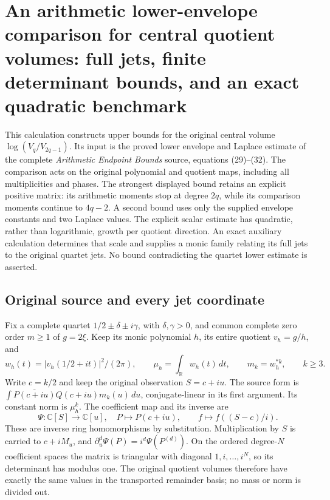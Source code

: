 \begingroup
\def\C{\mathbb{C}}
\def\R{\mathbb{R}}
\def\Tr{\operatorname{Tr}}
\def\diag{\operatorname{diag}}
\section{An arithmetic lower-envelope comparison for central quotient volumes: full jets, finite determinant bounds, and an exact quadratic benchmark}



This calculation constructs upper bounds for the original central volume
$\log(V_q/V_{2q-1})$. Its input is the proved lower envelope and Laplace
estimate of the complete \emph{Arithmetic Endpoint Bounds} source, equations
(29)--(32). The comparison acts on the original polynomial and quotient
maps, including all multiplicities and phases. The strongest displayed
bound retains an explicit positive matrix: its arithmetic moments stop at
degree $2q$, while its comparison moments continue to $4q-2$. A second
bound uses only the supplied envelope constants and two Laplace values.
The explicit scalar estimate has quadratic, rather than logarithmic,
growth per quotient direction. An exact auxiliary calculation determines
that scale and supplies a monic family relating its full jets to the
original quartet jets. No bound contradicting the quartet lower estimate
is asserted.

\subsection{Original source and every jet coordinate}

Fix a complete quartet $1/2\pm\delta\pm i\gamma$, with
$\delta,\gamma>0$, and common complete zero order $m\ge1$ of $g=2\xi$.
Keep its monic polynomial $h$, its entire quotient $v_h=g/h$, and
\[
 w_h(t)=|v_h(1/2+it)|^2/(2\pi),\qquad
 \mu_h=\int_{\R} w_h(t)\,dt,\qquad m_k=w_h^{*k},\qquad k\ge3.
 \tag{AU.1}
\]
Write $c=k/2$ and keep the original observation $S=c+iu$. The source
form is $\int\overline{P(c+iu)}Q(c+iu)m_k(u)\,du$, conjugate-linear
in its first argument. Its constant norm is $\mu_h^k$.
The coefficient map and its inverse are
\[
 \Psi:\C[S]\longrightarrow\C[u],\quad P\longmapsto P(c+iu),
 \qquad f\longmapsto f((S-c)/i).                             \tag{AU.2}
\]
These are inverse ring homomorphisms by substitution. Multiplication by
$S$ is carried to $c+iM_u$, and
$\partial_u^d\Psi(P)=i^d\Psi(P^{(d)})$. On the ordered degree-$N$
coefficient spaces the matrix is triangular with diagonal
$1,i,\ldots,i^N$, so its determinant has modulus one. The original
quotient volumes therefore have exactly the same values in the
transported remainder basis; no mass or norm is divided out.

